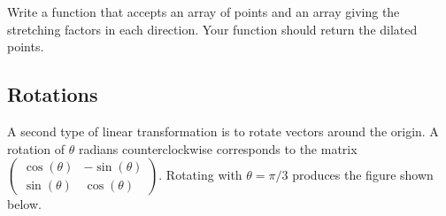 \begin{problem}
Write a function that accepts an array of points and an array giving the stretching factors in each direction.
Your function should return the dilated points.
\label{prob:dilation}
\end{problem}

\subsection*{Rotations} %

A second type of linear transformation is to rotate vectors around the origin.
A rotation of $\theta$ radians counterclockwise corresponds to the matrix $\begin{pmatrix}
\cos(\theta) & -\sin(\theta) \\
\sin(\theta) & \cos(\theta)
\end{pmatrix}.$
Rotating with $\theta = \pi/3$ produces the figure shown below.

